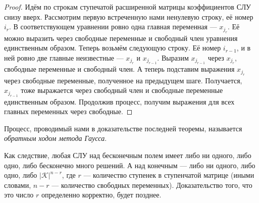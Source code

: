 \begin{proof}
    Идём по строкам ступечатой расширенной матрицы коэффициентов СЛУ снизу вверх. Рассмотрим первую встреченную нами ненулевую строку, её номер $i_r$. В соответствующем уравнении ровно одна главная переменная --- $x_{j_r}$. Её можно выразить через свободные переменные и свободный член уравнения единственным образом. Теперь возьмём следующую строку. Её номер $i_{r - 1}$, и в ней ровно две главные неизвестные --- $x_{j_r}$ и $x_{j_{r - 1}}$. Выразим $x_{j_{r - 1}}$ через $x_{j_r}$, свободные переменные и свободный член. А теперь подставим выражения $x_{j_r}$ через свободные переменные, полученное на предыдущем шаге. Получается, $x_{j_{r - 1}}$ тоже выражается через свободный член и свободные переменные единственным образом. Продолжив процесс, получим выражения для всех главных переменных через свободные.
\end{proof}

Процесс, проводимый нами в доказательстве последней теоремы, называется \textit{обратным ходом метода Гаусса}.

\begin{orangebox}
    Как следствие, любая СЛУ над бесконечным полем имеет либо ни одного, либо одно, либо бесконечно много решений. А над конечным --- либо ни одного, либо одно, либо $|\mathcal{K}|^{n - r}$, где $r$ --- количество ступенек в ступенчатой матрице (иными словами, $n - r$ --- количество свободных переменных). Доказательство того, что это число $r$ определенно корректно, будет позднее.
\end{orangebox}


